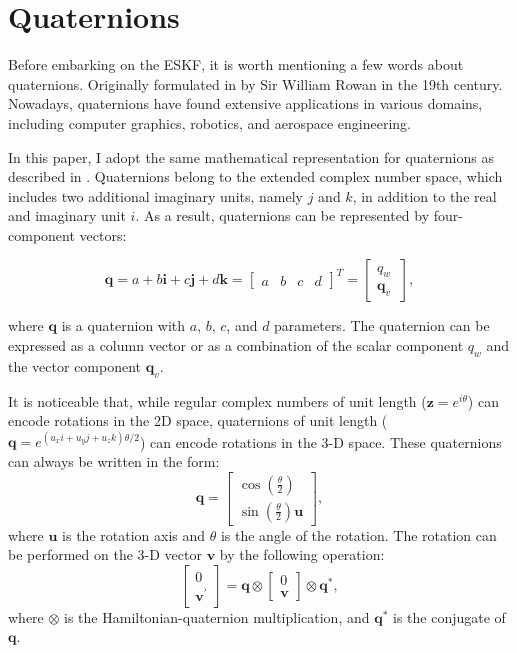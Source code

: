 \section{Quaternions}

Before embarking on the ESKF, it is worth mentioning a few words about quaternions. Originally formulated in \cite{quaternions} by Sir William Rowan in the 19th century. Nowadays, quaternions have found extensive applications in various domains, including computer graphics, robotics, and aerospace engineering.

In this paper, I adopt the same mathematical representation for quaternions as described in \cite{quaternion-eskf}. Quaternions belong to the extended complex number space, which includes two additional imaginary units, namely $j$ and $k$, in addition to the real and imaginary unit $i$. As a result, quaternions can be represented by four-component vectors:

\begin{equation}
    \mathbf{q} = a + b\mathbf{i} + c\mathbf{j} + d\mathbf{k} = \begin{bmatrix}
    a & b & c & d
    \end{bmatrix}^T = \begin{bmatrix}
    q_w \ \\ \mathbf{q}_v
    \end{bmatrix},
\end{equation}

where $\mathbf{q}$ is a quaternion with $a$, $b$, $c$, and $d$ parameters. The quaternion can be expressed as a column vector or as a combination of the scalar component $q_w$ and the vector component $\mathbf{q}_v$. 

It is noticeable that, while regular complex numbers of unit length ($\mathbf{z}=e^{i\theta}$) can encode rotations in the 2D space, quaternions of unit length ($\mathbf{q}=e^{(u_xi+u_yj+u_zk)\theta/2}$) can encode rotations in the 3-D space. These quaternions can always be written in the form:
\begin{equation}
    \mathbf{q}=\begin{bmatrix}
        \cos\left(\frac{\theta}{2}\right) \\
        \sin\left(\frac{\theta}{2}\right)\mathbf{u}
    \end{bmatrix},
\end{equation}
where $\mathbf{u}$ is the rotation axis and $\theta$ is the angle of the rotation. The rotation can be performed on the 3-D vector $\mathbf{v}$ by the following operation:
\begin{equation}
    \begin{bmatrix}
        0 \\ 
        \mathbf{v}^{'}
    \end{bmatrix}=\mathbf{q}\otimes\begin{bmatrix}
        0 \\ 
        \mathbf{v}
    \end{bmatrix}\otimes\mathbf{q}^*,
    \label{eq:quat-rot}
\end{equation}
where $\otimes$ is the Hamiltonian-quaternion multiplication, and $\mathbf{q}^*$ is the conjugate of $\mathbf{q}$. 


